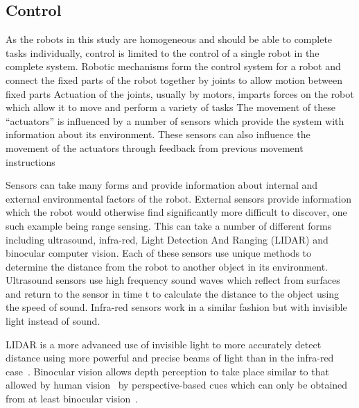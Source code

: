 \subsection{Control}\label{litreview/robotics/control}  
As the robots in this study are homogeneous and should be able to complete tasks individually, control is limited to the control of a single robot in the complete system. Robotic mechanisms form the control system for a robot and connect the fixed parts of the robot together by joints to allow motion between fixed parts%
Actuation of the joints, usually by motors, imparts forces on the robot which allow it to move and perform a variety of tasks%
The movement of these ``actuators'' is influenced by a number of sensors which provide the system with information about its environment. These sensors can also influence the movement of the actuators through feedback from previous movement instructions%

Sensors can take many forms and provide information about internal and external environmental factors of the robot. External sensors provide information which the robot would otherwise find significantly more difficult to discover, one such example being range sensing. This can take a number of different forms including ultrasound, infra-red, Light Detection And Ranging (LIDAR) and binocular computer vision. Each of these sensors use unique methods to determine the distance from the robot to another object in its environment. Ultrasound sensors use high frequency sound waves which reflect from surfaces and return to the sensor in time t to calculate the distance to the object using the speed of sound. Infra-red sensors work in a similar fashion but with invisible light instead of sound. 

LIDAR is a more advanced use of invisible light to more accurately detect distance using more powerful and precise beams of light than in the infra-red case~\cite{http://www.lidar-uk.com/how-lidar-works/}. Binocular vision allows depth perception to take place similar to that allowed by human vision~\cite{https://www.ncbi.nlm.nih.gov/pubmed/15471592} by perspective-based cues which can only be obtained from at least binocular vision~\cite{
https://www.cl.cam.ac.uk/techreports/UCAM-CL-TR-546.pdf}. 



